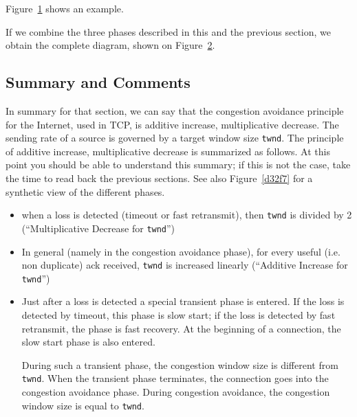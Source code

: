 Figure~\ref{d32f5} shows an example.
\begin{figure}[h]
        \protect\label{d32f5}
\end{figure}

If we combine the three phases described in this and the previous
section, we obtain the complete diagram, shown on Figure~\ref{d32f6}.
\begin{figure}[h]
        \protect\label{d32f6}
\end{figure}


\subsection{Summary and Comments}

In summary for that section, we can say that the congestion avoidance
principle for the Internet, used in TCP, is additive increase,
multiplicative decrease. The sending rate of a source is governed by a
target window size \texttt{twnd}. The principle of
additive increase,
multiplicative decrease is summarized as follows. At this point you
should be able to understand this summary; if this is not the case,
take the time to read back the previous sections. See also
Figure~\ref{d32f7} for a synthetic view of the different phases.

\begin{itemize}

        \item when a loss is detected (timeout or fast retransmit), then
        \texttt{twnd} is divided by 2 (``Multiplicative Decrease for
        \texttt{twnd}'')

        \item In general (namely in the congestion avoidance phase), for
        every useful (i.e. non duplicate) ack received, \texttt{twnd} is increased linearly
        (``Additive Increase for \texttt{twnd}'')

        \item  Just after a loss is detected a special transient phase is
        entered. If the loss is detected by timeout, this phase is slow
        start; if the loss is detected by fast retransmit, the phase is fast
        recovery. At the beginning of a
        connection, the slow start phase is also entered.

        During such a transient phase, the congestion window size is
        different from \texttt{twnd}. When the transient phase terminates,
        the connection goes into the congestion avoidance phase. During
        congestion avoidance, the congestion window size is
        equal to \texttt{twnd}.

\end{itemize}


